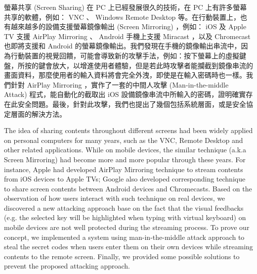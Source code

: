 \begin{abstractzh}

螢幕共享 (Screen Sharing) 在 PC 上已經發展很久的技術，在 PC 上有許多螢幕共享的軟體，例如： VNC 、 Windows Remote Desktop 等。在行動裝置上，也有越來越多的設備支援螢幕鏡像輸出 (Screen Mirroring) ，例如： iOS 及 Apple TV 支援 AirPlay Mirroring 、 Android 手機上支援 Miracast ，以及 Chromecast 也即將支援和 Android 的螢幕鏡像輸出。我們發現在手機的鏡像輸出串流中，因為行動裝置的視覺回饋，可能會導致新的攻擊手法，例如：按下螢幕上的虛擬鍵盤，所按的鍵會放大，以增進使用者體驗，但是若此時攻擊者能攔截到鏡像串流的畫面資料，那麼使用者的輸入資料將會完全外洩，即使是在輸入密碼時也一樣。我們針對 AirPlay Mirroring ，實作了一套的中間人攻擊 (Man-in-the-middle Attack) 程式，能自動化的截取出 iOS 設備鏡像串流中所輸入的密碼，證明確實存在此安全問題。最後，針對此攻擊，我們也提出了幾個包括系統層面，或是安全協定層面的解決方法。

\end{abstractzh}

\begin{abstracten}

The idea of sharing contents throughout different screens had been widely applied on personal computers for many years, such as the VNC, Remote Desktop and other related applications. While on mobile devices, the similar technique (a.k.a Screen Mirroring) had become more and more popular through these years. For instance, Apple had developed AirPlay Mirroring technique to stream contents from iOS devices to Apple TVs; Google also developed corresponding technique to share screen contents between Android devices and Chromecasts. Based on the observation of how users interact with such technique on real devices, we discovered a new attacking approach base on the fact that the visual feedbacks (e.g. the selected key will be highlighted when typing with virtual keyboard) on mobile devices are not well protected during the streaming process. To prove our concept, we implemented a system using man-in-the-middle attack approach to steal the secret codes when users enter them on their own devices while streaming contents to the remote screen. Finally, we provided some possible solutions to prevent the proposed attacking approach.

\end{abstracten}

\begin{comment}
\category{I2.10}{Computing Methodologies}{Artificial Intelligence --
Vision and Scene Understanding} \category{H5.3}{Information
Systems}{Information Interfaces and Presentation (HCI) -- Web-based
Interaction.}

\terms{Design, Human factors, Performance.}

\keywords{Region of interest, Visual attention model, Web-based
games, Benchmarks.}
\end{comment}
